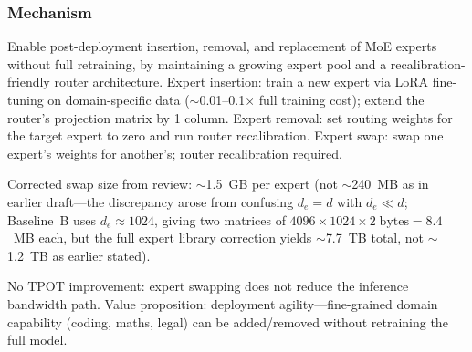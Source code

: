 \documentclass[11pt]{article}
\begin{document}
\subsubsection*{Mechanism}
Enable post-deployment insertion, removal, and replacement of MoE experts without full retraining, by maintaining a growing expert pool and a recalibration-friendly router architecture.
Expert insertion: train a new expert via LoRA fine-tuning on domain-specific data ($\sim$0.01--0.1$\times$ full training cost); extend the router's projection matrix by 1 column.
Expert removal: set routing weights for the target expert to zero and run router recalibration.
Expert swap: swap one expert's weights for another's; router recalibration required.

Corrected swap size from review: $\sim$1.5~GB per expert (not $\sim$240~MB as in earlier draft---the discrepancy arose from confusing $d_e=d$ with $d_e \ll d$; Baseline~B uses $d_e \approx 1024$, giving two matrices of $4096 \times 1024 \times 2\;\text{bytes} = 8.4$~MB each, but the full expert library correction yields $\sim$7.7~TB total, not $\sim$1.2~TB as earlier stated).

No TPOT improvement: expert swapping does not reduce the inference bandwidth path.
Value proposition: deployment agility---fine-grained domain capability (coding, maths, legal) can be added/removed without retraining the full model.
\end{document}
